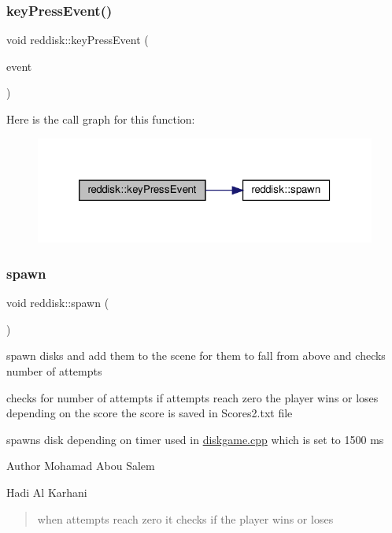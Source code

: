 \subsubsection{\texorpdfstring{key\+Press\+Event()}{keyPressEvent()}}
{\footnotesize\ttfamily void reddisk\+::key\+Press\+Event (\begin{DoxyParamCaption}\item[{Q\+Key\+Event $\ast$}]{event }\end{DoxyParamCaption})\hspace{0.3cm}{\ttfamily [inline]}}

Here is the call graph for this function\+:
\nopagebreak
\begin{figure}[H]
\begin{center}
\leavevmode
\includegraphics[width=320pt]{classreddisk_af1ec459fcb13a8b354b5a366d0ba2482_cgraph}
\end{center}
\end{figure}
\mbox{\label{classreddisk_a3afadb2c0d7b5a586aeebb613bdae3dc}} 
\subsubsection{\texorpdfstring{spawn}{spawn}}
{\footnotesize\ttfamily void reddisk\+::spawn (\begin{DoxyParamCaption}{ }\end{DoxyParamCaption})\hspace{0.3cm}{\ttfamily [slot]}}



spawn disks and add them to the scene for them to fall from above and checks number of attempts 

checks for number of attempts if attempts reach zero the player wins or loses depending on the score the score is saved in Scores2.\+txt file

spawns disk depending on timer used in \hyperlink{diskgame_8cpp}{diskgame.\+cpp} which is set to 1500 ms

\begin{DoxyAuthor}{Author}
Mohamad Abou Salem 

Hadi Al Karhani 
\end{DoxyAuthor}
\begin{quote}
when attempts reach zero it checks if the player wins or loses \end{quote}


